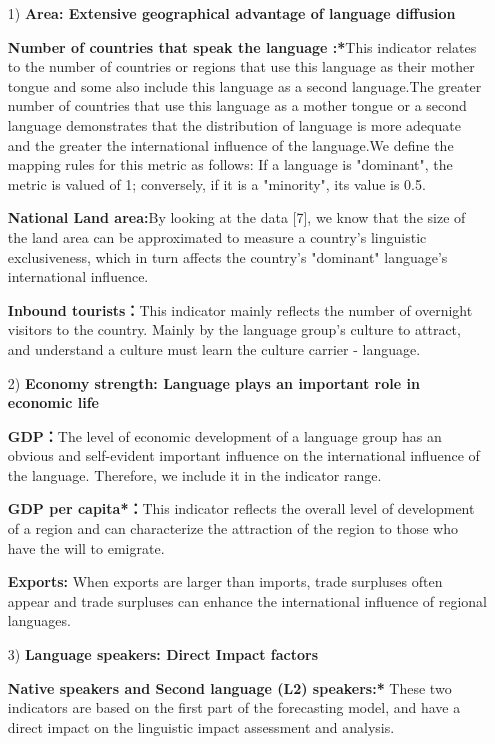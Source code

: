 \begin{enumerate}
	\item[1)] \textbf{Area: Extensive geographical advantage of language diffusion}
	\par \textbf{Number of countries that speak the language :*}This indicator relates to the number of countries or regions that use this language as their mother tongue and some also include this language as a second language.The greater number of countries that use this language as a mother tongue or a second language demonstrates that the distribution of language is more adequate and the greater the international influence of the language.We define the mapping rules for this metric as follows: If a language is "dominant", the metric is valued of 1; conversely, if it is a "minority", its value is 0.5.
	\par \textbf{National Land area:}By looking at the data [7], we know that the size of the land area can be approximated to measure a country's linguistic exclusiveness, which in turn affects the country's "dominant" language's international influence.
	\par \textbf{Inbound tourists：}This indicator mainly reflects the number of overnight visitors to the country. Mainly by the language group's culture to attract, and understand a culture must learn the culture carrier - language.
	
	\item[2)] \textbf{Economy strength: Language plays an important role in economic life}
	\par \textbf{GDP：}The level of economic development of a language group has an obvious and self-evident important influence on the international influence of the language. Therefore, we include it in the indicator range.
	\par \textbf{GDP per capita*：}This indicator reflects the overall level of development of a region and can characterize the attraction of the region to those who have the will to emigrate.
	\par \textbf{Exports: }When exports are larger than imports, trade surpluses often appear and trade surpluses can enhance the international influence of regional languages.
	
	\item[3)] \textbf{Language speakers: Direct Impact factors}
	\par \textbf{Native speakers and Second language (L2) speakers:*} These two indicators are based on the first part of the forecasting model, and have a direct impact on the linguistic impact assessment and analysis.
	

\end{enumerate}
